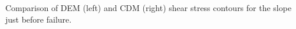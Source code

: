 \label{fig:S12DNS} Comparison of DEM (left) and CDM (right) shear stress contours for the slope just before failure.  